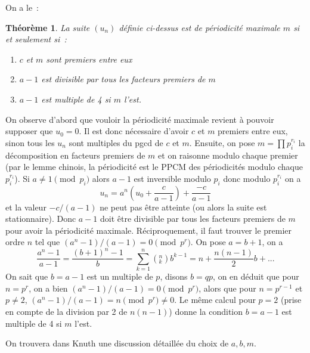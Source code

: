 \documentclass[a4paper,11pt]{article}
\newtheorem{thm}{Théorème}
\begin{document}
\begin{giacjshere}
On a le~:
\begin{thm}
La suite $(u_n)$ définie ci-dessus est de périodicité maximale $m$ si
et seulement si~:
\begin{enumerate}
\item $c$ et $m$ sont premiers entre eux
\item $a-1$ est divisible par tous les facteurs premiers de $m$
\item $a-1$ est multiple de 4 si $m$ l'est.
\end{enumerate}
\end{thm}
On observe d'abord que vouloir la périodicité maximale revient
à pouvoir supposer que $u_0=0$. 
Il est donc nécessaire d'avoir $c$
et $m$ premiers entre eux, sinon tous les $u_n$ sont multiples du
pgcd de $c$ et $m$. Ensuite, on pose $m=\prod p_i^{r_i}$ la
décomposition en facteurs premiers de $m$ et on raisonne modulo
chaque premier (par le lemme chinois, la p\'eriodicit\'e
est le PPCM des p\'eriodicit\'es modulo chaque $p_i^{r_i}$). 
Si $a\neq 1 \pmod p_i$
alors $a-1$ est inversible modulo $p_i$ donc modulo 
$p_i^{r_i}$ on a
$$ u_n=a^n (u_0 + \frac{c}{a-1}) + \frac{-c}{a-1}  $$
et la valeur $-c/(a-1)$ ne peut pas \^etre atteinte
(ou alors la suite est stationnaire).
Donc $a-1$ doit \^etre divisible par tous les facteurs premiers de $m$
pour avoir la p\'eriodicit\'e maximale.
R\'eciproquement, il faut trouver le premier ordre $n$ tel que
$(a^n-1)/(a-1)=0 \pmod{p^r}$. On pose $a=b+1$, on a
$$ \frac{a^n-1}{a-1}=\frac{(b+1)^n-1}{b} = \sum_{k=1}^n
\left(^n_k\right) b^{k-1} = n +\frac{n(n-1)}{2}b +... $$
On sait que $b=a-1$ est un multiple de $p$, disons $b=qp$, on en d\'eduit que
pour $n=p^r$, on a bien $(a^n-1)/(a-1)=0 \pmod{p^r}$, alors que
pour $n=p^{r-1}$ et $p\neq 2$, $(a^n-1)/(a-1)=n \pmod{p^r} \neq 0$.
Le m\^eme calcul pour $p=2$ (prise en compte de la division par 2 de
$n(n-1)$) donne la condition $b=a-1$ est multiple de 4 si $m$ l'est.

On trouvera dans Knuth une discussion détaillée du choix de $a,b,m$.



\end{giacjshere}
\end{document}

